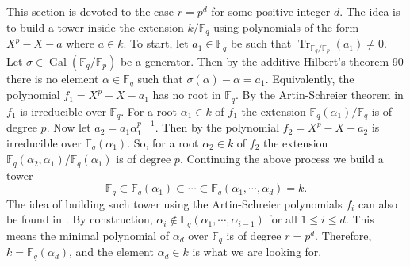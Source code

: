 \documentclass[12pt]{article}
\theoremstyle{plain}
\theoremstyle{definition}
\DeclareMathOperator{\trace}{Tr} %
\DeclareMathOperator{\gal}{Gal} %
\def\F{\ensuremath{\mathbb{F}}}
\begin{document}
This section is devoted to the case $r = p^d$ for some positive integer $d$. The idea is to build a 
tower inside the extension $k/\F_q$ using polynomials of the form $X^p - X - a$ where $a \in k$. To 
start, let $a_1 \in \F_q$ be such that $\trace_{\F_q/\F_p}(a_1) \ne 0$. Let $\sigma \in 
\gal(\F_q/\F_p)$ be a generator. Then by the additive Hilbert's theorem 90 there is no element 
$\alpha \in \F_q$ such that $\sigma(\alpha) - \alpha = a_1$. Equivalently, the polynomial $f_1 = 
X^p - X - a_1$ has no root in $\F_q$. By the Artin-Schreier theorem in \cite[Ch VI]{lang} $f_1$ 
is irreducible over $\F_q$. For a root $\alpha_1 \in k$ of $f_1$ the extension $\F_q(\alpha_1) / 
\F_q$ is of degree $p$.
Now let $a_2 = a_1\alpha_1^{p - 1}$. Then by \cite[Lemma 5]{Adleman-Lenstra} the polynomial $f_2 = 
X^p - X - a_2$ is irreducible over $\F_q(\alpha_1)$. So, for a root $\alpha_2 \in k$ of $f_2$ the 
extension $\F_q(\alpha_2, \alpha_1) / \F_q(\alpha_1)$ is of degree $p$. Continuing the above 
process we build a tower
\begin{equation}
	\label{equ:art-sch-tower}
	\F_q \subset \F_q(\alpha_1)  \subset \cdots \subset \F_q(\alpha_1, \cdots, \alpha_d) = k.
\end{equation}
The idea of building such tower using the Artin-Schreier polynomials $f_i$ can also be found in 
\cite{LenstraJr91, Allombert02, shoup93}. By construction, $\alpha_i \notin \F_q(\alpha_1, \cdots, 
\alpha_{i - 1})$ for all $1 \le i \le d$. This means the minimal polynomial of $\alpha_d$ over 
$\F_q$ is of degree $r = p^d$. Therefore, $k = \F_q(\alpha_d)$, and the element $\alpha_d \in k$ is 
what we are looking for.
\end{document}
